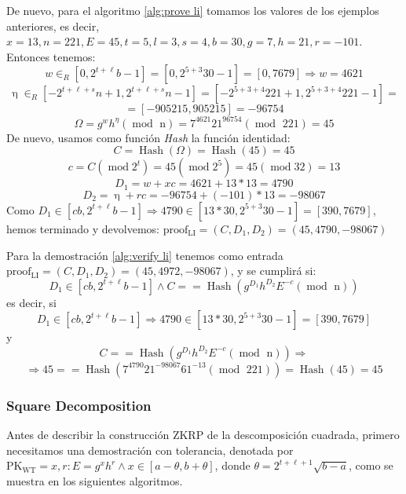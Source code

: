 De nuevo, para el algoritmo \eqref{alg:prove li} tomamos los valores de los ejemplos anteriores, es decir, $x = 13, n = 221, E = 45, t = 5, l = 3, s = 4, b = 30, g = 7, h = 21, r = -101$. \\
Entonces tenemos:
$$w \in_{R} [0, 2^{t+\ell}b-1] = [0, 2^{5+3}30-1] = [0, 7679] \Rightarrow w = 4621$$
$$\upeta \in_{R} [-2^{t+\ell+s}n+1, 2^{t+\ell+s}n-1] = [-2^{5+3+4}221+1, 2^{5+3+4}221-1] =$$ $$= [-905215, 905215] = -96754$$
$$\Omega = g^{w}h^{\eta} (\operatorname{mod} \text{ n}) = 7^{4621}21^{96754} (\operatorname{mod} \text{ 221}) = 45$$
De nuevo, usamos como función \emph{Hash} la función identidad:
$$C = \operatorname{Hash}(\Omega) = \operatorname{Hash}(45) = 45$$
$$c = C (\operatorname{mod} 2^{t}) = 45 (\operatorname{mod} 2^{5}) = 45 (\operatorname{mod} 32) = 13$$
$$D_{1} = w + xc = 4621 + 13 * 13 = 4790$$
$$D_{2} = \upeta + rc = -96754 + (-101) * 13 = -98067$$
Como $D_{1} \in [cb, 2^{t+\ell}b-1] \Rightarrow 4790 \in [13 * 30, 2^{5+3}30-1] = [390, 7679]$, hemos terminado y devolvemos: $\operatorname{proof_{LI}} = (C, D_{1}, D_{2}) = (45, 4790, -98067)$

Para la demostración \eqref{alg:verify li} tenemos como entrada \\ $\operatorname{proof_{LI}} = (C, D_{1}, D_{2}) = (45, 4972, -98067)$, y se cumplirá si:
$$D_{1} \in [cb, 2^{t+\ell}b-1] \wedge C == \operatorname{Hash}(g^{D_{1}}h^{D_{2}}E^{-c} (\operatorname{mod} \text{ n}))$$
es decir, si
$$D_{1} \in [cb, 2^{t+\ell}b-1] \Rightarrow 4790 \in [13 * 30, 2^{5+3}30-1] = [390, 7679]$$
y
$$C == \operatorname{Hash}(g^{D_{1}}h^{D_{2}}E^{-c} (\operatorname{mod} \text{ n})) \Rightarrow$$ $$\Rightarrow 45 == \operatorname{Hash}(7^{4790}21^{-98067}61^{-13} (\operatorname{mod} \text{ 221})) = \operatorname{Hash}(45) = 45$$

\subsubsection{Square Decomposition}  \label{proof:sd}

Antes de describir la construcción ZKRP de la descomposición cuadrada, primero necesitamos una demostración con tolerancia, denotada por \\ $\operatorname{PK_{WT}} = {x, r: E = g^{x} h^{r} \wedge x \in [a - \theta, b + \theta]}$, donde $\theta = 2^{t+\ell+1}\sqrt{b - a}$, como se muestra en los siguientes algoritmos.

